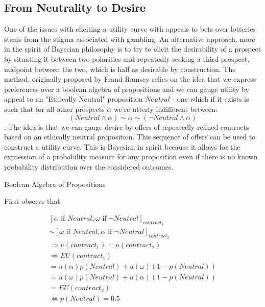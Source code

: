 \documentclass{tufte-handout}
\begin{document}
\subsection*{From Neutrality to Desire}
One of the issues with eliciting a utility curve with appeals to bets over lotteries stems from the stigma associated with gambling. An alternative approach, more in the spirit of Bayesian philosophy is to try to elicit the desirability of a prospect by situating it between two polarities and repeatedly seeking a third prospect, midpoint between the two, which is half as desirable by construction. The method, originally proposed by Frand Ramsey relies on the idea that we express preferences over a boolean algebra of propositions and we can gauge utility by appeal to an "Ethically Neutral" proposition $Neutral$ - one which if it exists is such that for all other prospects $\alpha$ we're utterly indifferent between: $$(Neutral \wedge \alpha) \sim \alpha \sim (\neg Neutral \wedge \alpha)$$. \noindent The idea is that we can gauge desire by offers of repeatedly refined contracts based on an ethically neutral proposition. This sequence of offers can be used to construct a utility curve. This is Bayesian in spirit because it allows for the expression of a probability measure for any proposition even if there is no known probability distribution over the considered outcomes. 
\begin{marginfigure}
\caption{Boolean Algebra of Propositions}%
  
  \label{fig:boolean_algebra}%
\end{marginfigure}

First observe that 

\begin{equation}
\begin{split}
[ \alpha \text{ if } Neutral, \omega \text{ if } \neg Neutral ]_{contract_{1}} \\  \sim [ \omega  \text{ if } Neutral, \alpha \text{ if } \neg Neutral ]_{contract_{2}} \\   \Rightarrow u(contract_{1})  = u(contract_{2})   \\  \Rightarrow EU(contract_{1}) \\ = u(\alpha)p(Neutral) + u(\omega)(1-p(Neutral)) \\ 
= u(\omega)p(Neutral) + u(\alpha)(1-p(Neutral)) \\ 
= EU(contract_{2})  
\\ \Leftrightarrow p(Neutral) = 0.5
\end{split}
\end{equation}
\end{document}
